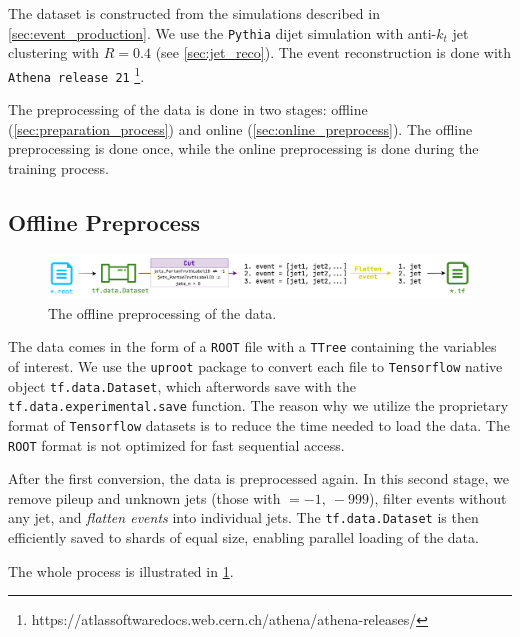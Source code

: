 The dataset is constructed from the \MC simulations described in \cref{sec:event_production}.
We use the \texttt{Pythia} dijet \MC simulation with anti-$k_t$ jet clustering with $R = 0.4$ (see \cref{sec:jet_reco}). 
The event reconstruction is done with \texttt{Athena release 21} \footnote{https://atlassoftwaredocs.web.cern.ch/athena/athena-releases/}.

The preprocessing of the data is done in two stages: offline (\cref{sec:preparation_process}) and online (\cref{sec:online_preprocess}).
The offline preprocessing is done once, while the online preprocessing is done during the training process.

\subsection{Offline Preprocess}
\begin{figure}[!ht]
    \centering
    \includegraphics[width=1.\textwidth]{src/diagrams/data_prep_off.png}
    \caption{The offline preprocessing of the data.}
    \label{fig:data_prep_off}
\end{figure}
\label{sec:preparation_process}
The data comes in the form of a \texttt{ROOT} \cite{root} file with a \texttt{TTree} containing the variables of interest.
We use the \texttt{uproot} \cite{uproot} package to convert each file to \texttt{Tensorflow} \cite{tf} native object \texttt{tf.data.Dataset}\footnotemark, which afterwords save with the \texttt{tf.data.experimental.save} function.
The reason why we utilize the proprietary format of \texttt{Tensorflow} datasets is to reduce the time needed to load the data.
The \texttt{ROOT} format is not optimized for fast sequential access. 

After the first conversion, the data is preprocessed again.
In this second stage, we remove pileup and unknown jets (those with \PID $= -1,\ -999$), filter events without any jet, and \emph{flatten events} into individual jets.
The \texttt{tf.data.Dataset} is then efficiently saved to shards of equal size, enabling parallel loading of the data.

The whole process is illustrated in \cref{fig:data_prep_off}.



